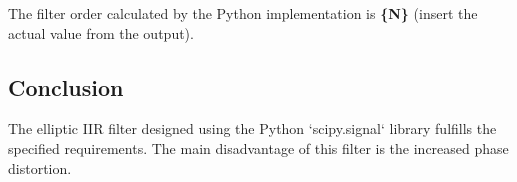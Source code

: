 The filter order calculated by the Python implementation is \textbf{\{N\}} (insert the actual value from the output).

\subsection*{Conclusion}
The elliptic IIR filter designed using the Python `scipy.signal` library fulfills the specified requirements. The main disadvantage of this filter is the increased phase distortion.
